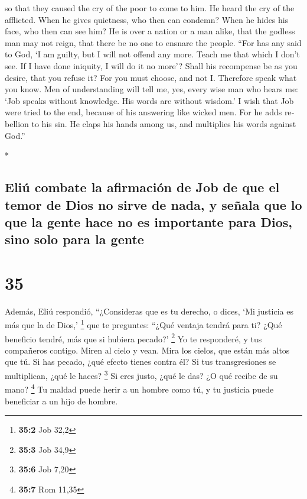 \begin{paracol}{2}
\begin{otherlanguage}{english}
 so that they caused the cry of the poor to come to him.
He heard the cry of the afflicted.  When he gives
quietness, who then can condemn? When he hides his face, who then can
see him? He is over a nation or a man alike,  that the
godless man may not reign, that there be no one to ensnare the people.
 ``For has any said to God, `I am guilty, but I will not
offend any more.  Teach me that which I don't see. If I
have done iniquity, I will do it no more'?  Shall his
recompense be as you desire, that you refuse it? For you must choose,
and not I. Therefore speak what you know.  Men of
understanding will tell me, yes, every wise man who hears me:
 `Job speaks without knowledge. His words are without
wisdom.'  I wish that Job were tried to the end, because
of his answering like wicked men.  For he adds rebellion
to his sin. He claps his hands among us, and multiplies his words
against God.''

\end{otherlanguage}

\switchcolumn[0]*

\hypertarget{eliuxfa-combate-la-afirmaciuxf3n-de-job-de-que-el-temor-de-dios-no-sirve-de-nada-y-seuxf1ala-que-lo-que-la-gente-hace-no-es-importante-para-dios-sino-solo-para-la-gente}{%
\subsection{Eliú combate la afirmación de Job de que el temor de Dios no
sirve de nada, y señala que lo que la gente hace no es importante para
Dios, sino solo para la
gente}\label{eliuxfa-combate-la-afirmaciuxf3n-de-job-de-que-el-temor-de-dios-no-sirve-de-nada-y-seuxf1ala-que-lo-que-la-gente-hace-no-es-importante-para-dios-sino-solo-para-la-gente}}

\hypertarget{section-68}{%
\section{35}\label{section-68}}

 Además, Eliú respondió,  ``¿Consideras que
es tu derecho, o dices, `Mi justicia es más que la de Dios,' \footnote{\textbf{35:2}
  Job 32,2}  que te preguntes: ``¿Qué ventaja tendrá para
ti? ¿Qué beneficio tendré, más que si hubiera pecado?' \footnote{\textbf{35:3}
  Job 34,9}  Yo te responderé, y tus compañeros contigo.
 Miren al cielo y vean. Mira los cielos, que están más
altos que tú.  Si has pecado, ¿qué efecto tienes contra
él? Si tus transgresiones se multiplican, ¿qué le haces? \footnote{\textbf{35:6}
  Job 7,20}  Si eres justo, ¿qué le das? ¿O qué recibe de
su mano? \footnote{\textbf{35:7} Rom 11,35}  Tu maldad
puede herir a un hombre como tú, y tu justicia puede beneficiar a un
hijo de hombre.


\end{paracol}
